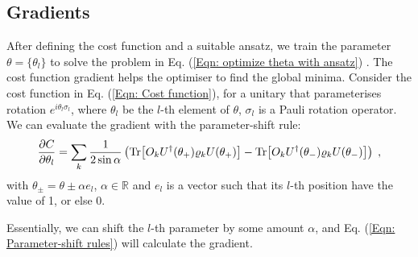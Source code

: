 \subsection{Gradients} \label{Sec: Gradients}
After defining the cost function and a suitable ansatz, we train the parameter $\theta = \{\theta_{l}\}$ to solve the problem in Eq. (\ref{Eqn: optimize theta with ansatz}) \cite{cerezo2021variational}.
The cost function gradient helps the optimiser to find the global minima.
Consider the cost function in Eq. (\ref{Eqn: Cost function}), for a unitary that parameterises rotation $e^{i \theta_l \sigma_{l}}$, where $\theta_l$ be the $l$-th element of $\theta$, $\sigma_l$ is a Pauli rotation operator.
We can evaluate the gradient with the parameter-shift rule:
\begin{equation}
    \frac{\partial C}{\partial\theta_l}
    = \sum_k \frac{1}{2 \sin{\alpha}}
    \left(
    \Tr[O_k U^\dagger(\theta_+) \varrho_k U(\theta_+)]
    - \Tr[O_k U^\dagger(\theta_-) \varrho_k U(\theta_-)]
    \right) \;,
    \label{Eqn: Parameter-shift rules}
\end{equation}
with $\theta_{\pm} = \theta \pm \alpha e_l$, $\alpha \in \mathbb{R}$ and $e_l$ is a vector such that its $l$-th position have the value of 1, or else 0.

Essentially, we can shift the $l$-th parameter by some amount $\alpha$, and Eq. (\ref{Eqn: Parameter-shift rules}) will calculate the gradient.
